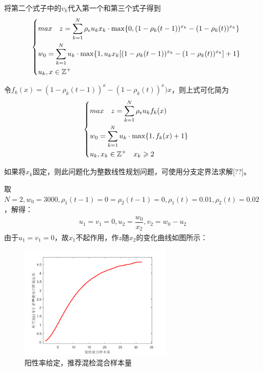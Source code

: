 \documentclass[withoutpreface,bwprint]{cumcmthesis} %
\begin{document}
将第二个式子中的$v_k$代入第一个和第三个式子得到
\begin{align}
\label{eq2solution1}
\quad\left\{
    \begin{aligned}
        &max\quad z = \sum^N_{k=1}\rho_e u_k x_k \cdot {\rm max}
         \{0,(1-\rho_k(t-1))^{x_k}-(1-\rho_k(t))^{x_k} \}   \\
        &w_0 = \sum^N_{k=1} u_k\cdot {\rm max} \{1, u_k x_k  [(1-\rho_k(t-1))^{x_k}-(1-\rho_k(t))^{x_k}] +1 \} \\
        &u_k,x\in\mathbb{Z^+}\\
    \end{aligned}
    \right.
\end{align}

令$f_k(x) = (1-\rho_k(t-1))^x-(1-\rho_k(t))^x)x$，则上式可化简为
\begin{align}
\label{eq2solution1}
\quad\left\{
    \begin{aligned}
        &max\quad z = \sum^N_{k=1}\rho_e u_k f_k(x)  \\
        &w_0 = \sum^N_{k=1} u_k \cdot {\rm max}\{1,f_k(x)+1\}  \\
        &u_k,x_k\in\mathbb{Z^+} \quad x_k \geqslant 2 \\
    \end{aligned}
    \right.
\end{align}

如果将$x_k$固定，则此问题化为整数线性规划问题，可使用分支定界法求解[??]。

取$N=2,w_0=3000,\rho_1(t-1)=0=\rho_2(t-1)=0,\rho_1(t)=0.01,\rho_2(t)=0.02$，解得：
\begin{align*}
    u_1=v_1=0, u_2=\dfrac{w_0}{x_2},v_2=w_0-u_2
\end{align*}
由于$u_1=v_1=0$，故$x_1$不起作用，作$z$随$x_2$的变化曲线如图所示：
\begin{figure}[H]
\centering
\includegraphics[width=0.65\textwidth]{fig_pro3.png}
\caption{阳性率给定，推荐混检混合样本量}
\label{pro1}
\end{figure}
\end{document}
